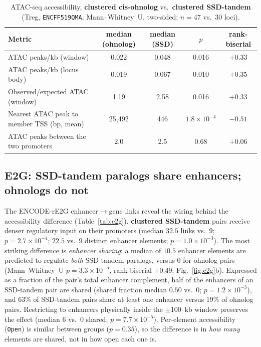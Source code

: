 \documentclass[11pt]{article}
\newcommand{\ohno}{\textcolor{ohno}{\textbf{clustered cis-ohnolog}}}
\newcommand{\ssd}{\textcolor{ssd}{\textbf{clustered SSD-tandem}}}
\begin{document}
\begin{table}[H]
\centering
\caption{ATAC-seq accessibility, \ohno{} vs.\ \ssd{} (Treg, \texttt{ENCFF519QMA};
Mann--Whitney~U, two-sided; $n=47$ vs.\ $30$ loci).}
\label{tab:atac}
\small
\begin{tabular}{lcccc}
\toprule
Metric & median (ohnolog) & median (SSD) & $p$ & rank-biserial \\
\midrule
ATAC peaks/kb (window)              & 0.022 & 0.048 & 0.016 & $+0.33$ \\
ATAC peaks/kb (locus body)          & 0.019 & 0.067 & 0.010 & $+0.35$ \\
Observed/expected ATAC (window)     & 1.19  & 2.58  & 0.016 & $+0.33$ \\
Nearest ATAC peak to member TSS (bp, mean) & 25{,}492 & 446 & $1.8\times10^{-4}$ & $-0.51$ \\
ATAC peaks between the two promoters       & 2.0 & 2.5 & 0.68 & $+0.06$ \\
\bottomrule
\end{tabular}
\end{table}

\subsection{E2G: SSD-tandem paralogs share enhancers; ohnologs do not}
The ENCODE-rE2G enhancer$\rightarrow$gene links reveal the wiring behind the accessibility
difference (Table~\ref{tab:e2g}). \ssd{} pairs receive denser regulatory input on their promoters
(median $32.5$ links vs.\ $9$; $p=2.7\times10^{-4}$; $22.5$ vs.\ $9$ distinct enhancer elements;
$p=1.0\times10^{-3}$). The most striking difference is \emph{enhancer sharing}: a median of $10.5$
enhancer elements are predicted to regulate \emph{both} SSD-tandem paralogs, versus $0$ for ohnolog
pairs (Mann--Whitney~U $p=3.3\times10^{-5}$, rank-biserial $+0.49$; Fig.~\ref{fig:e2g}b). Expressed
as a fraction of the pair's total enhancer complement, half of the enhancers of an SSD-tandem pair
are shared (shared fraction median $0.50$ vs.\ $0$; $p=1.2\times10^{-3}$), and $63\%$ of SSD-tandem
pairs share at least one enhancer versus $19\%$ of ohnolog pairs. Restricting to enhancers physically
inside the $\pm$100~kb window preserves the effect (median $6$ vs.\ $0$ shared; $p=7.7\times10^{-5}$).
Per-element accessibility (\texttt{Open}) is similar between groups ($p=0.35$), so the difference is
in \emph{how many} elements are shared, not in how open each one is.
\end{document}
